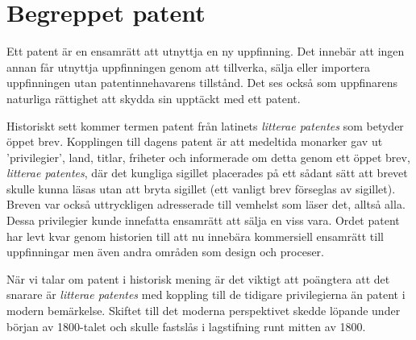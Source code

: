 



\section{Begreppet patent} %
\label{sec:lit}

Ett patent är en ensamrätt att utnyttja en ny uppfinning.
Det innebär att ingen annan får utnyttja uppfinningen genom att tillverka, sälja eller importera uppfinningen utan patentinnehavarens tillstånd.
Det ses också som uppfinarens naturliga rättighet att skydda sin upptäckt med ett patent.

Historiskt sett kommer termen patent från latinets \emph{litterae patentes} som
betyder öppet brev. Kopplingen till dagens patent är att medeltida monarker gav
ut 'privilegier', land, titlar, friheter och informerade om detta genom ett
öppet brev, \emph{litterae patentes}, där det kungliga sigillet placerades på
ett sådant sätt att brevet skulle kunna läsas utan att bryta sigillet\cite{blackstone} (ett vanligt brev förseglas av sigillet). Breven var också uttryckligen adresserade till 
vemhelst som läser det, alltså alla. Dessa privilegier kunde innefatta ensamrätt
att sälja en viss vara. Ordet patent har levt kvar genom historien till 
att nu innebära kommersiell ensamrätt till uppfinningar men även andra områden som design och proceser. 

När vi talar om patent i historisk mening är det viktigt att poängtera att det 
snarare är \emph{litterae patentes} med koppling till de tidigare 
privilegierna än patent i modern bemärkelse. Skiftet till det moderna perspektivet skedde löpande under början av 1800-talet och skulle fastslås i lagstifning runt mitten av 1800.
